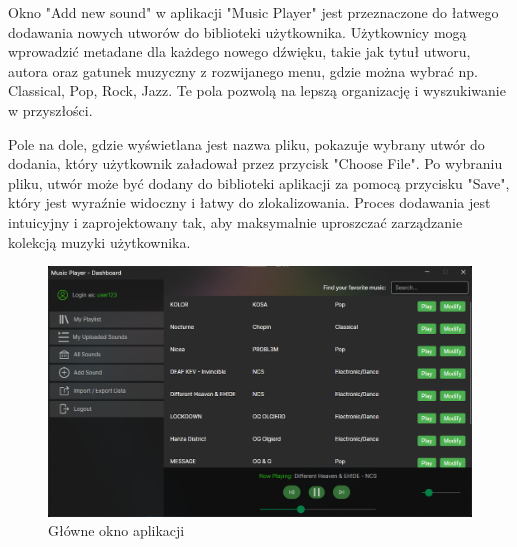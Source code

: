{Okno "Add new sound" w aplikacji "Music Player" jest przeznaczone do łatwego dodawania nowych utworów do biblioteki użytkownika. Użytkownicy mogą wprowadzić metadane dla każdego nowego dźwięku, takie jak tytuł utworu, autora oraz gatunek muzyczny z rozwijanego menu, gdzie można wybrać np. Classical, Pop, Rock, Jazz. Te pola pozwolą na lepszą organizację i wyszukiwanie w przyszłości.

Pole na dole, gdzie wyświetlana jest nazwa pliku, pokazuje wybrany utwór do dodania, który użytkownik załadował przez przycisk "Choose File". Po wybraniu pliku, utwór może być dodany do biblioteki aplikacji za pomocą przycisku "Save", który jest wyraźnie widoczny i łatwy do zlokalizowania.
Proces dodawania jest intuicyjny i zaprojektowany tak, aby maksymalnie uproszczać zarządzanie kolekcją muzyki użytkownika.}

\newpage

\begin{figure}[!ht]
	\begin{center}
	\includegraphics[width=500pt]{figures/main1.png}
        \caption{{\footnotesize Główne okno aplikacji}}
	\end{center}
\end{figure}

